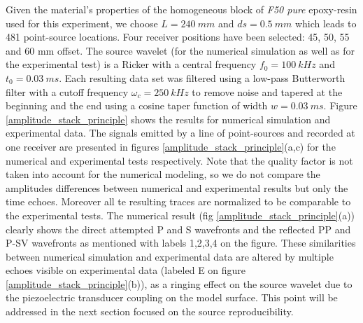 \documentclass[manuscript,revised]{geophysics}
\begin{document}
\noindent Given the material's properties of the homogeneous block of \textit{F50 pure} epoxy-resin used for this experiment, we choose $L=240\ mm$ and $ds=0.5\ mm$ which leads to 481 point-source locations. Four receiver positions have been selected: 45, 50, 55 and 60 mm offset. The source wavelet (for the numerical simulation as well as for the experimental test) is a Ricker with a central frequency $f_{0}=100\ kHz$ and $t_{0}=0.03\ ms$. Each resulting data set was filtered using a low-pass Butterworth filter with a cutoff frequency $\omega_{c}=250\ kHz$ to remove noise and tapered at the beginning and the end using a cosine taper function of width $w=0.03\ ms$. Figure \ref{amplitude_stack_principle} shows the results for numerical simulation and experimental data. The signals emitted by a line of point-sources and recorded at one receiver are presented in figures \ref{amplitude_stack_principle}(a,c) for the numerical and experimental tests respectively.  Note that the quality factor is not taken into account for the numerical modeling, so we do not compare the amplitudes differences between numerical and experimental results but only the time echoes. Moreover all te resulting traces are normalized to be comparable to the experimental tests. The numerical result (fig \ref{amplitude_stack_principle}(a)) clearly shows the direct attempted P and S wavefronts and the reflected PP and P-SV wavefronts as mentioned with labels 1,2,3,4 on the figure. These similarities between numerical simulation and experimental data are altered by multiple echoes visible on experimental data (labeled E on figure \ref{amplitude_stack_principle}(b)), as a ringing effect on the source wavelet due to the piezoelectric transducer coupling on the model surface. This point will be addressed in the next section focused on the source reproducibility.   
\end{document}
